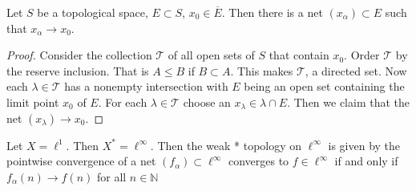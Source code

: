 \begin{example}
  Let $S$ be a topological space, $E \subset S$, $x_0 \in
  \overline{E}$. Then there is a net $(x_\alpha) \subset E$ such that
  $x_\alpha \to x_0$.
\end{example}
\begin{proof}
  Consider the collection $\mathscr{T}$ of all open sets of $S$ that
  contain $x_0$. Order $\mathscr{T}$ by the reserve inclusion. That
  is $A \le B$ if $B \subset A$. This makes $\mathscr{T}$, a directed
  set. Now each $ \lambda \in \mathscr{T}$ has a nonempty
  intersection with $E$ being an open set containing the limit point
  $x_0$ of $E$. For each $\lambda \in \mathscr{T}$ choose an
  $x_\lambda \in \lambda\cap E$. Then we claim that the net
  $(x_\lambda) \to x_0$.
\end{proof}

\begin{example}
  Let $X = \ell^{1}$. Then $X^{*} = \ell^{\infty}$. Then the weak *
  topology on $\ell^{\infty}$ is given by the pointwise convergence
  of a net $(f_\alpha) \subset \ell^{\infty}$ converges to $f \in
  \ell^{\infty}$ if and only if $f_\alpha(n) \to f(n)$ for all $ n
  \in \mathbb{N}$
\end{example}


